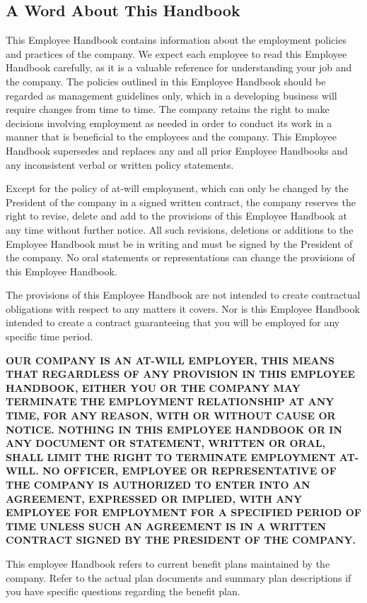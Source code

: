 \documentclass{book}
\begin{document}
\subsection{A Word About This Handbook}

This Employee Handbook contains information about the employment policies and practices of the company. We expect each employee to read this Employee Handbook carefully, as it is a valuable reference for understanding your job and the company. The policies outlined in this Employee Handbook should be regarded as management guidelines only, which in a developing business will require changes from time to time. The company retains the right to make decisions involving employment as needed in order to conduct its work in a manner that is beneficial to the employees and the company. This Employee Handbook supersedes and replaces any and all prior Employee Handbooks and any inconsistent verbal or written policy statements.

Except for the policy of at-will employment, which can only be changed by the President of the company in a signed written contract, the company reserves the right to revise, delete and add to the provisions of this Employee Handbook at any time without further notice. All such revisions, deletions or additions to the Employee Handbook must be in writing and must be signed by the President of the company. No oral statements or representations can change the provisions of this Employee Handbook.

The provisions of this Employee Handbook are not intended to create contractual obligations with respect to any matters it covers. Nor is this Employee Handbook intended to create a contract guaranteeing that you will be employed for any specific time period.

\textbf{OUR COMPANY IS AN AT-WILL EMPLOYER, THIS MEANS THAT REGARDLESS OF ANY PROVISION IN THIS EMPLOYEE HANDBOOK, EITHER YOU OR THE COMPANY MAY TERMINATE THE EMPLOYMENT RELATIONSHIP AT ANY TIME, FOR ANY REASON, WITH OR WITHOUT CAUSE OR NOTICE. NOTHING IN THIS EMPLOYEE HANDBOOK OR IN ANY DOCUMENT OR STATEMENT, WRITTEN OR ORAL, SHALL LIMIT THE RIGHT TO TERMINATE EMPLOYMENT AT-WILL. NO OFFICER, EMPLOYEE OR REPRESENTATIVE OF THE COMPANY IS AUTHORIZED TO ENTER INTO AN AGREEMENT, EXPRESSED OR IMPLIED, WITH ANY EMPLOYEE FOR EMPLOYMENT FOR A SPECIFIED PERIOD OF TIME UNLESS SUCH AN AGREEMENT IS IN A WRITTEN CONTRACT SIGNED BY THE PRESIDENT OF THE COMPANY.}

This employee Handbook refers to current benefit plans maintained by the company. Refer to the actual plan documents and summary plan descriptions if you have specific questions regarding the benefit plan.
\end{document}
